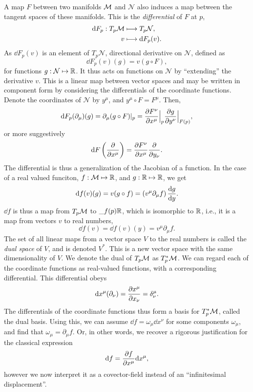 A map $F$ between two manifolds $\mathcal{M}$ and $\mathcal N$ also induces a map between the tangent spaces of these manifolds.
This is the \emph{differential} of $F$ at $p$, 
%
\begin{align}
    \text{d} F_p: T_p \mathcal{M} & \longmapsto T_p \mathcal N, \\
    v & \longmapsto \text{d} F_p (v). 
\end{align}
%
As $\dd F_p(v)$ is an element of $T_p \mathcal N$,   directional derivative on $\mathcal N$, defined as
%
\begin{equation}
    \dd F_p(v) (g) = v(g \circ F),
\end{equation}
%
for functions $g : \mathcal N \mapsto \mathbb{R}$.
It thus acts on functions on $\mathcal N$ by ``extending'' the derivative $v$.
This is a linear map between vector spaces and may be written in component form by considering the differentials of the coordinate functions.
Denote the coordinates of $\mathcal N$ by $y^\mu$, and $y^\mu \circ F = F^\mu$.
Then,
%
\begin{equation}
    \dd F_p (\partial_\mu) (g) = \partial_\mu (g \circ F) |_p 
    = \diffp{F^\nu}{x^\mu}\Big |_p \diffp{g}{y^\nu} \Big  |_{F(p)},
\end{equation}
%
or more suggestively
%
\begin{equation}
    \dd F \left( \diffp{}{x^\mu} \right) = \diffp{F^\nu}{x^\mu} \diffp{}{y_\nu}.
\end{equation}
%
The differential is thus a generalization of the Jacobian of a function.
In the case of a real valued funciton, $f: \mathcal{M} \mapsto \mathbb{R}$, and $g : \mathbb{R} \mapsto \mathbb{R}$, we get
%
\begin{equation}
    \dd f (v) (g) 
    = v(g \circ f) 
    = (v^\mu \partial_\mu f) \, \diff{g}{y}.
\end{equation}
%
$\dd f$ is thus a map from $T_p \mathcal{M}$ to $\_{f(p)}\mathbb{R}$, which is isomorphic to $\mathbb{R}$, i.e.,
it is a map from vectors $v$ to real numbers,
%
\begin{equation}
    \dd f(v) = \dd f(v)(y) = v^\mu \partial_\mu f.
\end{equation}
%
The set of all linear maps from a vector space $V$ to the real numbers is called the \emph{dual space} of $V$, and is denoted $V^*$.
This is a new vector space with the same dimensionality of $V$.
We denote the dual of $T_p \mathcal{M}$ as $T_p^* \mathcal{M}$.
We can regard each of the coordinate functions as real-valued functions, with a corresponding differential.
This differential obeys
%
\begin{equation}
    \dd x^\mu (\partial_\nu) = \diffp{x^\mu}{x_\nu} = \delta^\mu_\nu.
\end{equation}
%
The differentials of the coordinate functions thus form a basis for $T^*_p \mathcal{M}$, called the dual basis.
Using this, we can assume $\dd f = \omega_\mu \dd x^\nu$ for some components $\omega_\mu$, and find that $\omega_\mu = \partial_\mu f$.
Or, in other words, we recover a rigorous justification for the classical expression 
%
\begin{equation}
    \dd f = \diffp{f}{x^\mu} \dd x^\mu,
\end{equation}
however we now interpret it as a covector-field instead of an ``infinitesimal displacement''.


